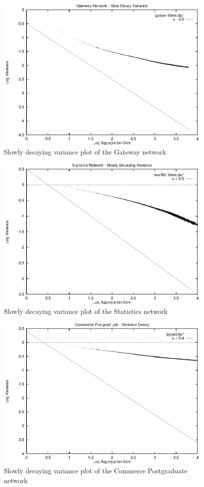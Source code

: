 \begin{figure}
\includegraphics[height=3in]{pics/gatew-10ms-sta.eps}
\caption{Slowly decaying variance plot of the Gateway network}
\label{results:gatew.10ms.sta}
\end{figure}

\begin{figure}
\includegraphics[height=3in]{pics/snet93-10ms-sta.eps}
\caption{Slowly decaying variance plot of the Statistics network}
\label{results:snet93.10ms.sta}
\end{figure}

\begin{figure}
\includegraphics[height=3in]{pics/pgrad-10ms-sta.eps}
\caption{Slowly decaying variance plot of the Commerce Postgraduate network}
\label{results:pgrad.10ms.sta}
\end{figure}

